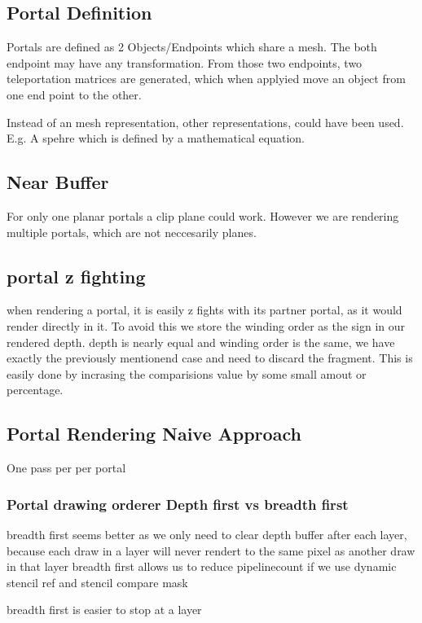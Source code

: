 \subsection{Portal Definition}
Portals are defined as 2 Objects/Endpoints which share a mesh. The both endpoint may have any transformation. From those two endpoints, two teleportation matrices are generated, which when applyied move an object from one end point to the other.

Instead of an mesh representation, other representations, could have been used. E.g. A spehre which is defined by a mathematical equation.

\subsection{Near Buffer}
For only one planar portals a clip plane could work. However we are rendering multiple portals, which are not neccesarily planes.


\subsection{portal z fighting}
when rendering a portal, it is easily z fights with its partner portal, as it would render directly in it. To avoid this we store the winding order as the sign in our rendered depth.  depth is nearly equal and winding order is the same, we have exactly the previously mentionend case and need to discard the fragment. This is easily done by incrasing the comparisions value by some small amout or percentage.

\subsection{Portal Rendering Naive Approach}
One pass per per portal

\subsubsection{Portal drawing orderer Depth first vs breadth first}

breadth first seems better as we only need to clear depth buffer after each layer, because
each draw in a layer will never rendert to the same pixel as another draw in that layer
breadth first allows us to reduce pipelinecount if we use dynamic stencil ref and stencil compare mask

breadth first is easier to stop at a layer

